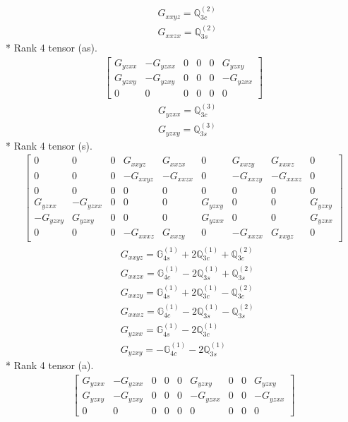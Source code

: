 \documentclass[fleqn,8pt,landscape]{jsarticle}
\begin{document}
\begin{align*}
& G_{xxyz} = \mathbb{Q}_{3c}^{(2)} \\
& G_{xxzx} = \mathbb{Q}_{3s}^{(2)}
\end{align*}
* Rank 4 tensor (as).
\begin{align*}
\begin{bmatrix} G_{yzxx} & - G_{yzxx} & 0 & 0 & 0 & G_{yzxy} \\ G_{yzxy} & - G_{yzxy} & 0 & 0 & 0 & - G_{yzxx} \\ 0 & 0 & 0 & 0 & 0 & 0 \end{bmatrix}
\end{align*}
\begin{align*}
& G_{yzxx} = \mathbb{Q}_{3c}^{(3)} \\
& G_{yzxy} = \mathbb{Q}_{3s}^{(3)}
\end{align*}
* Rank 4 tensor (s).
\begin{align*}
\begin{bmatrix} 0 & 0 & 0 & G_{xxyz} & G_{xxzx} & 0 & G_{xxzy} & G_{xxxz} & 0 \\ 0 & 0 & 0 & - G_{xxyz} & - G_{xxzx} & 0 & - G_{xxzy} & - G_{xxxz} & 0 \\ 0 & 0 & 0 & 0 & 0 & 0 & 0 & 0 & 0 \\ G_{yzxx} & - G_{yzxx} & 0 & 0 & 0 & G_{yzxy} & 0 & 0 & G_{yzxy} \\ - G_{yzxy} & G_{yzxy} & 0 & 0 & 0 & G_{yzxx} & 0 & 0 & G_{yzxx} \\ 0 & 0 & 0 & - G_{xxxz} & G_{xxzy} & 0 & - G_{xxzx} & G_{xxyz} & 0 \end{bmatrix}
\end{align*}
\begin{align*}
& G_{xxyz} = \mathbb{G}_{4s}^{(1)} + 2 \mathbb{Q}_{3c}^{(1)} + \mathbb{Q}_{3c}^{(2)} \\
& G_{xxzx} = \mathbb{G}_{4c}^{(1)} - 2 \mathbb{Q}_{3s}^{(1)} + \mathbb{Q}_{3s}^{(2)} \\
& G_{xxzy} = \mathbb{G}_{4s}^{(1)} + 2 \mathbb{Q}_{3c}^{(1)} - \mathbb{Q}_{3c}^{(2)} \\
& G_{xxxz} = \mathbb{G}_{4c}^{(1)} - 2 \mathbb{Q}_{3s}^{(1)} - \mathbb{Q}_{3s}^{(2)} \\
& G_{yzxx} = \mathbb{G}_{4s}^{(1)} - 2 \mathbb{Q}_{3c}^{(1)} \\
& G_{yzxy} = - \mathbb{G}_{4c}^{(1)} - 2 \mathbb{Q}_{3s}^{(1)}
\end{align*}
* Rank 4 tensor (a).
\begin{align*}
\begin{bmatrix} G_{yzxx} & - G_{yzxx} & 0 & 0 & 0 & G_{yzxy} & 0 & 0 & G_{yzxy} \\ G_{yzxy} & - G_{yzxy} & 0 & 0 & 0 & - G_{yzxx} & 0 & 0 & - G_{yzxx} \\ 0 & 0 & 0 & 0 & 0 & 0 & 0 & 0 & 0 \end{bmatrix}
\end{align*}
\end{document}
